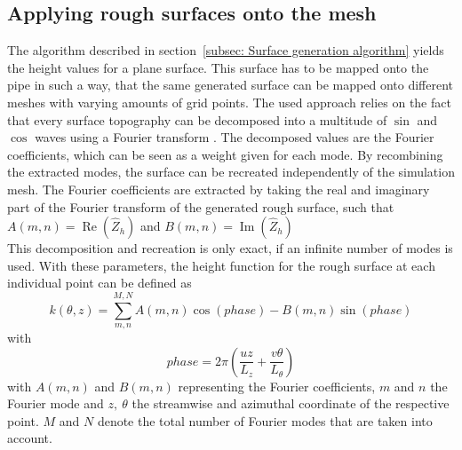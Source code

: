 \subsection{Applying rough surfaces onto the mesh}\label{subsec: Generating rough mesh}
The algorithm described in section~\ref{subsec: Surface generation algorithm} yields the height values for a plane surface.
This surface has to be mapped onto the pipe in such a way, that the same generated surface can be mapped onto different meshes with varying amounts of grid points.
The used approach relies on the fact that every surface topography can be decomposed into a multitude of $\sin$ and $\cos$ waves using a Fourier transform \citep{perez-rafolsGeneratingRandomlyRough2019}.
The decomposed values are the Fourier coefficients, which can be seen as a weight given for each mode.
By recombining the extracted modes, the surface can be recreated independently of the simulation mesh.
The Fourier coefficients are extracted by taking the real and imaginary part  of the Fourier transform of the generated rough surface, such that $A(m,n) = \operatorname{Re}\left(\hat{Z}_h\right)$ and $B(m,n) = \operatorname{Im}\left(\hat{Z}_h\right)$\\
This decomposition and recreation is only exact, if an infinite number of modes is used.
With these parameters, the height function for the rough surface at each individual point can be defined as
\begin{equation}\label{eq: height function}
    k(\theta,z) = \sum_{m,n}^{M,N} A(m,n)\cos(phase)- B(m,n)\sin(phase)
\end{equation}
with
\begin{equation}\label{eq: phase equation}
    phase = 2\pi\left(\frac{uz}{L_z} + \frac{v\theta}{L_{\theta}}\right)
\end{equation}
with $A(m,n)$ and $B(m,n)$ representing the Fourier coefficients, $m$ and $n$ the Fourier mode and $z,\ \theta$ the streamwise and azimuthal coordinate of the respective point.
$M$ and $N$ denote the total number of Fourier modes that are taken into account.
